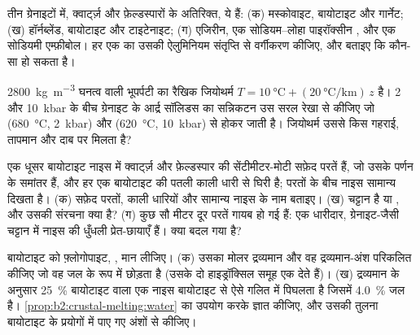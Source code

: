 \begin{exercise}[$\star$]\label{exo:b2:crustal-melting:2}
तीन ग्रेनाइटों में, क्वार्ट्ज़ और फ़ेल्डस्पारों के अतिरिक्त, ये हैं: (क) मस्कोवाइट, बायोटाइट और गार्नेट;
(ख) हॉर्नब्लेंड, बायोटाइट और टाइटेनाइट; (ग) एजिरीन, एक सोडियम--लोहा पाइरॉक्सीन
, और एक सोडियमी एम्फ़ीबोल। हर एक का उसकी ऐलुमिनियम संतृप्ति से वर्गीकरण कीजिए, और बताइए
कि कौन-सा  हो सकता है।
\end{exercise}

\begin{exercise}[$\star$]\label{exo:b2:crustal-melting:3}
\qty{2800}{\kilogram\per\cubic\metre} घनत्व वाली भूपर्पटी का रैखिक जियोथर्म
$T = \qty{10}{\celsius} + (\qty{20}{\celsius\per\kilo\metre})\,z$ है। 2 और
\qty{10}{kbar} के बीच ग्रेनाइट के आर्द्र सॉलिडस का सन्निकटन उस सरल रेखा से कीजिए जो
(\qty{680}{\celsius}, \qty{2}{kbar}) और (\qty{620}{\celsius}, \qty{10}{kbar}) से होकर जाती है। जियोथर्म उससे किस
गहराई, तापमान और दाब पर मिलता है?
\end{exercise}

\begin{exercise}[$\star$]\label{exo:b2:crustal-melting:4}
एक धूसर बायोटाइट नाइस में क्वार्ट्ज़ और फ़ेल्डस्पार की सेंटीमीटर-मोटी सफ़ेद परतें हैं, जो
उसके पर्णन के समांतर हैं, और हर एक बायोटाइट की पतली काली धारी से घिरी है; परतों के बीच
नाइस सामान्य दिखता है। (क) सफ़ेद परतों, काली धारियों और सामान्य नाइस के नाम बताइए।
(ख) चट्टान  है या , और उसकी संरचना क्या है? (ग) कुछ सौ
मीटर दूर परतें गायब हो गई हैं: एक धारीदार, ग्रेनाइट-जैसी चट्टान में नाइस की धुँधली
प्रेत-छायाएँ हैं। क्या बदल गया है?
\end{exercise}

\begin{exercise}[$\star\star$]\label{exo:b2:crustal-melting:5}
बायोटाइट को फ़्लोगोपाइट, , मान लीजिए। (क) उसका मोलर द्रव्यमान और
वह द्रव्यमान-अंश परिकलित कीजिए जो वह जल के रूप में छोड़ता है (उसके दो हाइड्रॉक्सिल समूह एक  देते हैं)।
(ख) द्रव्यमान के अनुसार \qty{25}{\percent} बायोटाइट वाला एक नाइस बायोटाइट  से
ऐसे गलित में पिघलता है जिसमें \qty{4.0}{\percent} जल है।
\cref{prop:b2:crustal-melting:water} का उपयोग करके  ज्ञात कीजिए, और उसकी तुलना
बायोटाइट  के प्रयोगों में पाए गए अंशों से कीजिए।
\end{exercise}

